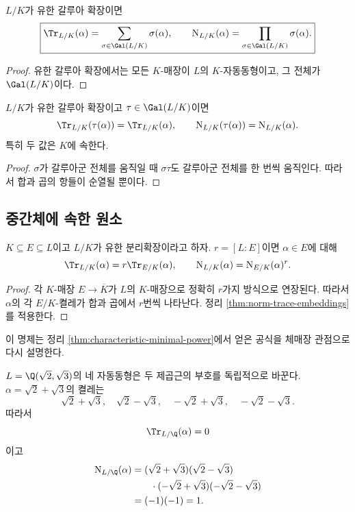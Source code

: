 \begin{corollary}
\label{cor:norm-trace-galois-sum-product}
$L/K$가 유한 갈루아 확장이면
\[
  \boxed{
  \Tr_{L/K}(\alpha)
  =\sum_{\sigma\in\Gal(L/K)}\sigma(\alpha),
  \qquad
  \operatorname N_{L/K}(\alpha)
  =\prod_{\sigma\in\Gal(L/K)}\sigma(\alpha).}
\]
\end{corollary}

\begin{proof}
유한 갈루아 확장에서는 모든 $K$-매장이 $L$의 $K$-자동동형이고, 그 전체가 $\Gal(L/K)$이다.
\end{proof}

\begin{corollary}
\label{cor:norm-trace-galois-invariance}
$L/K$가 유한 갈루아 확장이고 $\tau\in\Gal(L/K)$이면
\[
  \Tr_{L/K}(\tau(\alpha))=\Tr_{L/K}(\alpha),
  \qquad
  \operatorname N_{L/K}(\tau(\alpha))=\operatorname N_{L/K}(\alpha).
\]
특히 두 값은 $K$에 속한다.
\end{corollary}

\begin{proof}
$\sigma$가 갈루아군 전체를 움직일 때 $\sigma\tau$도 갈루아군 전체를 한 번씩 움직인다. 따라서 합과 곱의 항들이 순열될 뿐이다.
\end{proof}

\subsection{중간체에 속한 원소}

\begin{proposition}
\label{prop:norm-trace-element-in-intermediate-field}
$K\subseteq E\subseteq L$이고 $L/K$가 유한 분리확장이라고 하자. $r=[L:E]$이면 $\alpha\in E$에 대해
\[
  \Tr_{L/K}(\alpha)=r\Tr_{E/K}(\alpha),
  \qquad
  \operatorname N_{L/K}(\alpha)
  =\operatorname N_{E/K}(\alpha)^r.
\]
\end{proposition}

\begin{proof}
각 $K$-매장 $E\to\overline K$가 $L$의 $K$-매장으로 정확히 $r$가지 방식으로 연장된다. 따라서 $\alpha$의 각 $E/K$-켤레가 합과 곱에서 $r$번씩 나타난다. 정리 \ref{thm:norm-trace-embeddings}를 적용한다.
\end{proof}

이 명제는 정리 \ref{thm:characteristic-minimal-power}에서 얻은 공식을 체매장 관점으로 다시 설명한다.

\begin{example}[이중 이차확장]
$L=\Q(\sqrt2,\sqrt3)$의 네 자동동형은 두 제곱근의 부호를 독립적으로 바꾼다. $\alpha=\sqrt2+\sqrt3$의 켤레는
\[
  \sqrt2+\sqrt3,
  \quad\sqrt2-\sqrt3,
  \quad-\sqrt2+\sqrt3,
  \quad-\sqrt2-\sqrt3.
\]
따라서
\[
  \Tr_{L/\Q}(\alpha)=0
\]
이고
\[
\begin{aligned}
  \operatorname N_{L/\Q}(\alpha)
  &=(\sqrt2+\sqrt3)(\sqrt2-\sqrt3)\\
  &\qquad\cdot(-\sqrt2+\sqrt3)(-\sqrt2-\sqrt3)\\
  &=(-1)(-1)=1.
\end{aligned}
\]
\end{example}

